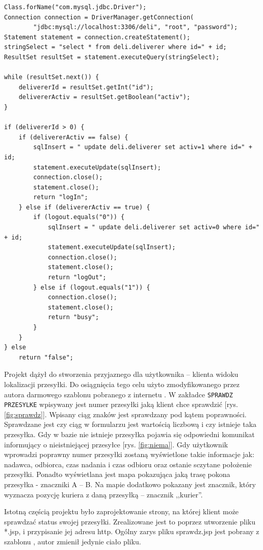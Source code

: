 \documentclass[eng,printmode,oneside]{mgr}
\begin{document}
\begin{lstlisting}[caption=Połączenia z bazą danych na przykładzie metody
sprawdzającej istnienie kuriera oraz jego stan
używanej przez aplikację
mobilną,label=lst:CheckIsExistsDeveliverer.selectFromDB.java]
Class.forName("com.mysql.jdbc.Driver");
Connection connection = DriverManager.getConnection(
		"jdbc:mysql://localhost:3306/deli", "root", "password");
Statement statement = connection.createStatement();
stringSelect = "select * from deli.deliverer where id=" + id;
ResultSet resultSet = statement.executeQuery(stringSelect);

while (resultSet.next()) {
	delivererId = resultSet.getInt("id");
	delivererActiv = resultSet.getBoolean("activ");
} 

if (delivererId > 0) {
	if (delivererActiv == false) {
		sqlInsert = " update deli.deliverer set activ=1 where id=" + id;
		statement.executeUpdate(sqlInsert);
		connection.close();
		statement.close();
		return "logIn";
	} else if (delivererActiv == true) {
		if (logout.equals("0")) {
			sqlInsert = " update deli.deliverer set activ=0 where id=" + id;
			statement.executeUpdate(sqlInsert);
			connection.close();
			statement.close();
			return "logOut";
		} else if (logout.equals("1")) {
			connection.close();
			statement.close();
			return "busy";
		}
	}
} else
	return "false";
\end{lstlisting}

Projekt dążył do stworzenia przyjaznego dla użytkownika -- klienta widoku
lokalizacji przesyłki. Do osiągnięcia tego celu użyto zmodyfikowanego przez
autora darmowego szablonu pobranego z internetu \cite{szablon}. W zakładce
\texttt{SPRAWDZ PRZESYLKE} wpisywany jest numer przesyłki jaką klient chce
sprawdzić [rys.
\ref{fig:sprawdz}]. Wpisany ciąg znaków jest sprawdzany pod kątem poprawności.
Sprawdzane jest czy ciąg w formularzu jest wartością liczbową i czy istnieje
taka przesyłka. Gdy w bazie nie istnieje przesyłka pojawia się odpowiedni komunikat
informujący o nieistniejącej przesyłce [rys. \ref{fig:niema}]. Gdy użytkownik
wprowadzi poprawny numer przesyłki zostaną wyświetlone takie informacje jak:
nadawca, odbiorca, czas nadania i czas odbioru oraz ostanie sczytane położenie
przesyłki. Ponadto wyświetlana jest mapa pokazująca jaką trasę pokona przesyłka
- znaczniki A -- B. Na mapie dodatkowo pokazany jest znacznik, który wyznacza
pozycję kuriera z daną przesyłką -- znacznik ,,kurier''.

Istotną częścią projektu było zaprojektowanie strony, na której
klient może sprawdzać status swojej przesyłki. Zrealizowane jest to poprzez
utworzenie pliku *.jsp, i przypisanie jej adresu http. Ogólny zarys pliku sprawdz.jsp jest
pobrany z szablonu \cite{szablon}, autor zmienił jedynie ciało pliku. 
\end{document}
